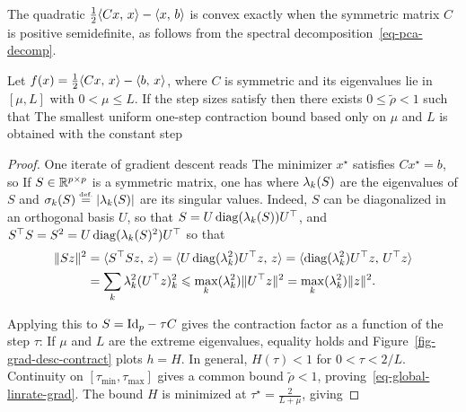 The quadratic $\frac{1}{2} \langle Cx,\,x\rangle - \langle x,\,b\rangle$ is convex exactly when the symmetric matrix $C$ is positive semidefinite, as follows from the spectral decomposition~\eqref{eq-pca-decomp}.

\begin{prop}\label{prop-graddesc-quad}
	Let $f(x)=\frac12\langle Cx,\,x\rangle-\langle b,\,x\rangle$, where $C$ is symmetric and its eigenvalues lie in $[\mu,L]$ with $0<\mu\leq L$. If the step sizes satisfy
	then there exists $0 \leq \tilde\rho<1$ such that 
	The smallest uniform one-step contraction bound based only on $\mu$ and $L$ is obtained with the constant step
\end{prop}
\begin{proof}
	One iterate of gradient descent reads 
	The minimizer $x^\star$ satisfies $Cx^\star=b$, so
	If $S \in \mathbb{R}^{p \times p}$ is a symmetric matrix, one has 
	where $\lambda_k(S)$ are the eigenvalues of $S$ and $\sigma_k(S) \stackrel{\mbox{\upshape\tiny def.}}{=} |\lambda_k(S)|$ are its singular values.
	Indeed, $S$ can be diagonalized in an orthogonal basis $U$, so that $S=U \operatorname{diag}(\lambda_k(S)) U^\top$,
	and $S^\top S = S^2 = U \operatorname{diag}(\lambda_k(S)^2) U^\top$ so that 
	\begin{align*}
		\lVert Sz\rVert^2 &= \langle S^\top S z,\,z\rangle = \langle U\operatorname{diag}(\lambda_k^2)U^\top z,\,z\rangle
		=\langle \operatorname{diag}(\lambda_k^2) U^\top z,\,U^\top z\rangle \\
		&= \sum_k\lambda_k^2 (U^\top z)_k^2 \leqslant \max_k(\lambda_k^2) \lVert U^\top z\rVert^2
		= \max_k(\lambda_k^2) \lVert z\rVert^2.
	\end{align*}
	
	Applying this to $S = \mathrm{Id}_p-\tau C$ gives the contraction factor as a function of the step $\tau$:
	If $\mu$ and $L$ are the extreme eigenvalues, equality holds and Figure~\ref{fig-grad-desc-contract} plots $h=H$. In general, $H(\tau)<1$ for $0<\tau<2/L$. Continuity on $[\tau_{\min},\tau_{\max}]$ gives a common bound $\tilde\rho<1$, proving~\eqref{eq-global-linrate-grad}.
	The bound $H$ is minimized at $\tau^\star = \frac{2}{L+\mu}$, giving
\end{proof}



